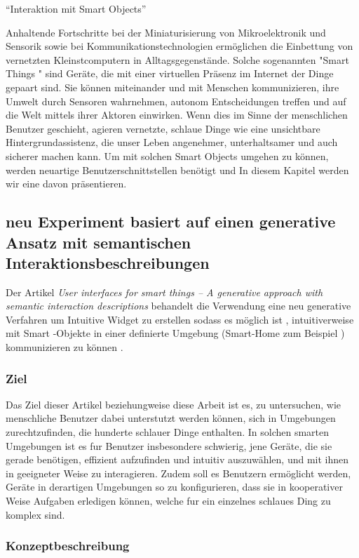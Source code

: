 \enquote{Interaktion mit Smart Objects}

Anhaltende Fortschritte bei der Miniaturisierung von Mikroelektronik und Sensorik sowie bei Kommunikationstechnologien ermöglichen die Einbettung von vernetzten Kleinstcomputern in Alltagsgegenstände. Solche sogenannten "Smart Things " sind Geräte, die mit einer virtuellen
Präsenz im Internet der Dinge gepaart sind. Sie können miteinander und mit Menschen kommunizieren, ihre Umwelt durch Sensoren wahrnehmen, autonom Entscheidungen treffen und auf die Welt mittels ihrer Aktoren einwirken. Wenn dies im Sinne der menschlichen Benutzer geschieht, agieren vernetzte, schlaue Dinge wie eine unsichtbare Hintergrundassistenz, die unser Leben angenehmer, unterhaltsamer und auch sicherer machen kann.
Um mit solchen Smart Objects umgehen zu können, werden neuartige Benutzerschnittstellen benötigt und In diesem Kapitel werden wir eine davon präsentieren.


\subsection{neu Experiment basiert auf einen generative Ansatz mit semantischen Interaktionsbeschreibungen}


Der Artikel \textit{User interfaces for smart things -- A generative approach with semantic interaction descriptions} \cite{Abe.2015} behandelt die Verwendung  eine neu generative Verfahren um Intuitive Widget zu erstellen sodass es möglich ist , intuitiverweise  mit Smart -Objekte in einer definierte Umgebung (Smart-Home zum Beispiel ) kommunizieren zu können .

\subsubsection{Ziel}

Das Ziel dieser Artikel beziehungweise diese Arbeit ist es, zu untersuchen, wie menschliche Benutzer dabei unterstutzt werden können, sich in Umgebungen zurechtzufinden, die hunderte schlauer Dinge enthalten. In solchen smarten Umgebungen ist es fur Benutzer insbesondere schwierig, jene Geräte, die sie gerade benötigen, effizient aufzufinden und intuitiv auszuwählen, und mit
ihnen in geeigneter Weise zu interagieren. Zudem soll es Benutzern ermöglicht werden, Geräte in derartigen Umgebungen so zu konfigurieren, dass sie in kooperativer Weise Aufgaben erledigen können, welche fur ein einzelnes schlaues Ding zu komplex sind. 


\subsubsection{Konzeptbeschreibung}

